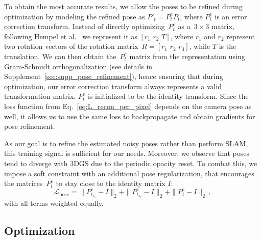 To obtain the most accurate results, we allow the poses to be refined during optimization
by modeling the refined pose as $P'_t = P^e_t P_t$, where  $P^e_t$ is an error correction transform. 
Instead of directly optimizing~$P^e_t$ as a~$3 \times 3$ matrix, following Hempel et al.~\cite{6d_rotation} we represent it as $[r_1\,\, r_2\,\, T]$, where $r_1$ and $r_2$ represent two rotation vectors of the rotation matrix~$R = [r_1\,\, r_2\,\, r_3]$, while $T$ is the translation.
We can then obtain the~$P^e_t$ matrix from the representation using Gram-Schmidt orthogonalization (see details in Supplement~\ref{sec:supp_pose_refinement}), hence ensuring that during optimization, our error correction transform always represents a valid transformation matrix. 
$P^e_t$ is initialized to be the identity transform. Since the loss function from Eq.~\eqref{eq:L_recon_per_pixel} depends on the camera pose as well, it allows us to use the same loss to backpropagate and obtain gradients for pose refinement. 

As our goal is to refine the estimated noisy poses rather than perform SLAM, this training signal is sufficient for our needs. Moreover, we observe that poses tend to diverge with 3DGS due to the periodic opacity reset.
To combat this, we impose a soft constraint with an additional pose regularization, that encourages the matrices~$P^e_t$ to stay close to the identity matrix $I$:
\begin{equation}
    \mathcal{L}_{\text{pose}} = \| P^e_{t_{s_1}} - I \|_2 + \| P^e_{t_{s_2}} - I \|_2 + \| P^e_{t} - I \|_2
    \label{eq:L_pose} \mathrm{\,,}
\end{equation}
with all terms weighted equally. 


\subsection{Optimization}
\label{ssec:Optimization} 

